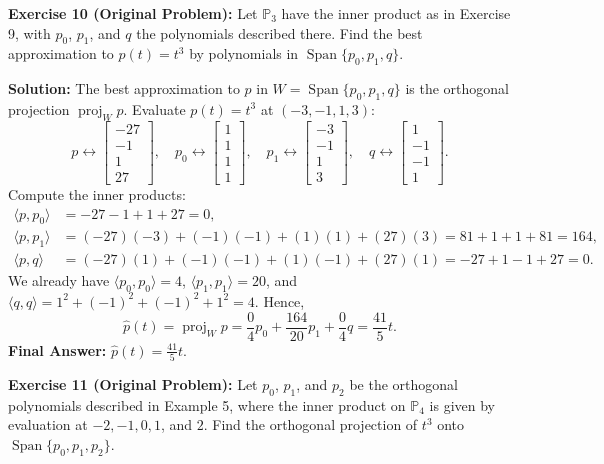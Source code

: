 \documentclass[11pt, letterpaper]{article}
\theoremstyle{definition}
\theoremstyle{remark}
\begin{document}
\textbf{Exercise 10 (Original Problem):} Let $\mathbb{P}_3$ have the inner product as in Exercise 9, with $p_0$, $p_1$, and $q$ the polynomials described there. Find the best approximation to $p(t) = t^3$ by polynomials in $\operatorname{Span}\{p_0, p_1, q\}$.

\textbf{Solution:}
The best approximation to $p$ in $W = \operatorname{Span}\{p_0, p_1, q\}$ is the orthogonal projection $\operatorname{proj}_W p$. Evaluate $p(t) = t^3$ at $(-3, -1, 1, 3)$:
\[
    p \leftrightarrow \begin{bmatrix} -27 \\ -1 \\ 1 \\ 27 \end{bmatrix}, \quad
    p_0 \leftrightarrow \begin{bmatrix} 1 \\ 1 \\ 1 \\ 1 \end{bmatrix}, \quad
    p_1 \leftrightarrow \begin{bmatrix} -3 \\ -1 \\ 1 \\ 3 \end{bmatrix}, \quad
    q \leftrightarrow \begin{bmatrix} 1 \\ -1 \\ -1 \\ 1 \end{bmatrix}.
\]
Compute the inner products:
\begin{align*}
    \langle p, p_0 \rangle &= -27 - 1 + 1 + 27 = 0, \\
    \langle p, p_1 \rangle &= (-27)(-3) + (-1)(-1) + (1)(1) + (27)(3) = 81 + 1 + 1 + 81 = 164, \\
    \langle p, q \rangle &= (-27)(1) + (-1)(-1) + (1)(-1) + (27)(1) = -27 + 1 - 1 + 27 = 0.
\end{align*}
We already have $\langle p_0, p_0 \rangle = 4$, $\langle p_1, p_1 \rangle = 20$, and $\langle q, q \rangle = 1^2 + (-1)^2 + (-1)^2 + 1^2 = 4$. Hence,
\[
    \hat{p}(t) = \operatorname{proj}_W p = \frac{0}{4}p_0 + \frac{164}{20}p_1 + \frac{0}{4}q = \frac{41}{5}t.
\]
\textbf{Final Answer:} $\displaystyle \hat{p}(t) = \frac{41}{5}t$.

\textbf{Exercise 11 (Original Problem):} Let $p_0$, $p_1$, and $p_2$ be the orthogonal polynomials described in Example 5, where the inner product on $\mathbb{P}_4$ is given by evaluation at $-2, -1, 0, 1$, and $2$. Find the orthogonal projection of $t^3$ onto $\operatorname{Span}\{p_0, p_1, p_2\}$.
\end{document}
